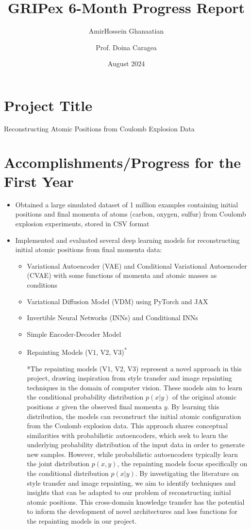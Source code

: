 \documentclass{article}
\title{GRIPex 6-Month Progress Report}
\author{AmirHossein Ghanaatian \and Prof. Doina Caragea}
\date{August 2024}
\begin{document}
\maketitle
\section*{Project Title}
Reconstructing Atomic Positions from Coulomb Explosion Data

\section*{Accomplishments/Progress for the First Year}
\begin{itemize}
    \item Obtained a large simulated dataset of 1 million examples containing initial positions and final momenta of atoms (carbon, oxygen, sulfur) from Coulomb explosion experiments, stored in CSV format
    \item Implemented and evaluated several deep learning models for reconstructing initial atomic positions from final momenta data:
\begin{itemize}[label={-}]
    \item Variational Autoencoder (VAE) and Conditional Variational Autoencoder (CVAE) with some functions of momenta and atomic masses as conditions
    \item Variational Diffusion Model (VDM) using PyTorch and JAX
    \item Invertible Neural Networks (INNs) and Conditional INNs
    \item Simple Encoder-Decoder Model
    \item Repainting Models (V1, V2, V3)\textsuperscript{*}
        \vspace{1em}
        
        \footnotesize{*The repainting models (V1, V2, V3) represent a novel approach in this project, drawing inspiration from style transfer and image repainting techniques in the domain of computer vision. These models aim to learn the conditional probability distribution $p(x|y)$ of the original atomic positions $x$ given the observed final momenta $y$. By learning this distribution, the models can reconstruct the initial atomic configuration from the Coulomb explosion data.
        This approach shares conceptual similarities with probabilistic autoencoders, which seek to learn the underlying probability distribution of the input data in order to generate new samples. However, while probabilistic autoencoders typically learn the joint distribution $p(x, y)$, the repainting models focus specifically on the conditional distribution $p(x|y)$.
        By investigating the literature on style transfer and image repainting, we aim to identify techniques and insights that can be adapted to our problem of reconstructing initial atomic positions. This cross-domain knowledge transfer has the potential to inform the development of novel architectures and loss functions for the repainting models in our project.}
    \end{itemize}
    

\end{itemize}
\end{document}
